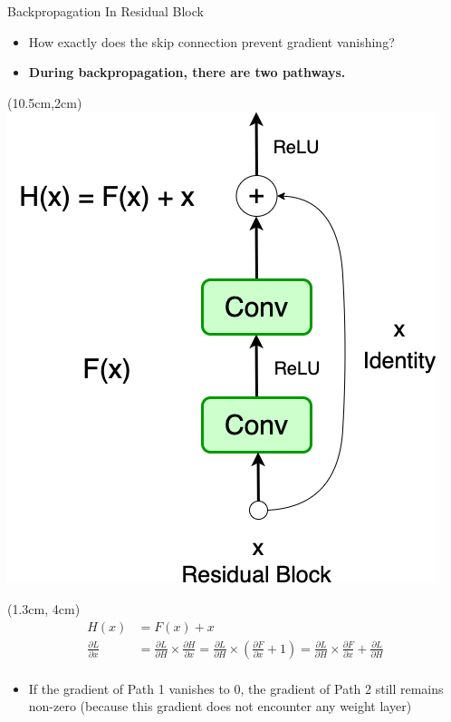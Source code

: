 \documentclass[serif, aspectratio=169]{beamer}
\begin{document}
\begin{frame}{Backpropagation In Residual Block}
	\begin{itemize}
		\item How exactly does the skip connection \newline prevent gradient vanishing?
		\item \textbf{During backpropagation, there are two pathways.}
	\end{itemize}
	
	\begin{textblock*}{5cm}(10.5cm,2cm) %
		\includegraphics[keepaspectratio, scale=0.3]{pic/resBlock3}
	\end{textblock*}

    \begin{textblock*}{10cm}(1.3cm, 4cm) 
		$$			
		\begin{aligned}
			H(x) & = F(x) + x \\
			\frac{\partial L}{\partial x} & = \frac{\partial L}{\partial H} \times \frac{\partial H}{\partial x} = \frac{\partial L}{\partial H} \times \left( \frac{\partial F}{\partial x} + 1 \right) = \frac{\partial L}{\partial H} \times \frac{\partial F}{\partial x} + \frac{\partial L}{\partial H} \\
		\end{aligned}
		$$
	\end{textblock*}
	
	\vspace{2.2cm}
	\begin{itemize}
		\item If the gradient of Path 1 vanishes to 0, the gradient of \newline Path 2 still remains non-zero (because this gradient \newline  does not encounter any weight layer)
	\end{itemize}
\end{frame}
\end{document}
